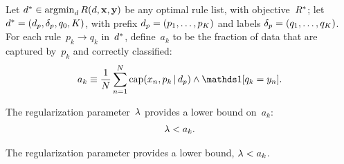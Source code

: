 \begin{theorem}
\label{thm:min-capture-correct}
Let ${d^* \in \operatorname*{argmin}_{d} R({d}, \mathbf{x}, \mathbf{y})}$
be any optimal rule list, with objective~$R^*$;
let ${d^* = (d_p, \delta_p, q_0, K)}$,
with prefix ${d_p = (p_1, \dots, p_K)}$
and labels ${\delta_p = (q_1, \dots, q_K)}$.
%
For each rule~${p_k \rightarrow q_k}$ in~$d^*$,
define~$a_k$ to be the fraction of data that are captured by~$p_k$
and correctly classified:
\begin{align}
a_k \equiv \frac{1}{N} \sum_{n=1}^N
  \Cap(x_n, p_k \given \Prefix) \wedge \one [ q_k = y_n ].
\label{eq:rule-correct}
\end{align}
\begin{arxiv}
The regularization parameter~${\lambda}$ provides a lower bound on~$a_k$:
\begin{align}
{\lambda} < a_k.
\label{eq:min-capture-correct}
\end{align}
\end{arxiv}
\begin{kdd}
The regularization parameter provides a lower bound, ${\lambda} < a_k$.
\end{kdd}
\end{theorem}

